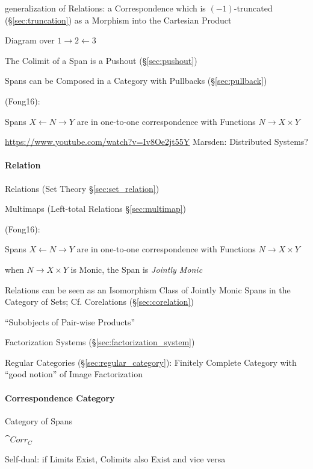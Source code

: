 generalization of Relations: a Correspondence which is
$(-1)$-truncated (\S\ref{sec:truncation}) as a Morphism into the
Cartesian Product

Diagram over $1 \rightarrow 2 \leftarrow 3$

The Colimit of a Span is a Pushout (\S\ref{sec:pushout})

Spans can be Composed in a Category with Pullbacks
(\S\ref{sec:pullback})

(Fong16):

Spans $X \leftarrow N \rightarrow Y$ are in one-to-one correspondence
with Functions $N \rightarrow X \times Y$

\url{https://www.youtube.com/watch?v=Iv8Oe2jt55Y} Marsden: Distributed
Systems? %



\paragraph{Relation}\label{sec:relation}\hfill

\fist Relations (Set Theory \S\ref{sec:set_relation})

\fist Multimaps (Left-total Relations \S\ref{sec:multimap})

(Fong16):

Spans $X \leftarrow N \rightarrow Y$ are in one-to-one correspondence
with Functions $N \rightarrow X \times Y$

when $N \rightarrow X \times Y$ is Monic, the Span is \emph{Jointly
  Monic}

Relations can be seen as an Isomorphism Class of Jointly Monic Spans
in the Category of Sets; \fist Cf. Corelations
(\S\ref{sec:corelation})

``Subobjects of Pair-wise Products'' %

Factorization Systems (\S\ref{sec:factorization_system}) %

\fist Regular Categories (\S\ref{sec:regular_category}): Finitely
Complete Category with ``good notion'' of Image Factorization



\paragraph{Correspondence Category}\label{sec:correspondence_category}\hfill

Category of Spans

$\cat{Corr_C}$

Self-dual: if Limits Exist, Colimits also Exist and vice versa



